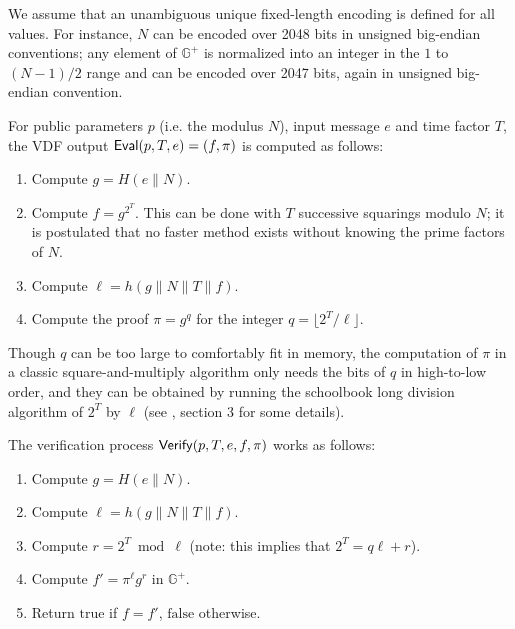 \documentclass{llncs}
\newcommand{\bG}{\mathbb{G}}
\newcommand{\Eval}{\text{\textsf{Eval}}}
\newcommand{\Verify}{\text{\textsf{Verify}}}
\begin{document}
We assume that an unambiguous unique fixed-length encoding is defined
for all values. For instance, $N$ can be encoded over 2048 bits in
unsigned big-endian conventions; any element of $\bG^+$ is normalized
into an integer in the $1$ to $(N-1)/2$ range and can be encoded over
2047 bits, again in unsigned big-endian convention.

For public parameters $p$ (i.e. the modulus $N$), input message $e$ and
time factor $T$, the VDF output $\Eval(p, T, e) = (f, \pi)$ is computed
as follows:
\begin{enumerate}

    \item Compute $g = H(e \parallel N)$.

    \item Compute $f = g^{2^T}$. This can be done with $T$ successive
    squarings modulo $N$; it is postulated that no faster method exists
    without knowing the prime factors of $N$.

    \item Compute $\ell = h(g \parallel N \parallel T \parallel f)$.

    \item Compute the proof $\pi = g^q$ for the integer
    $q = \lfloor 2^T/\ell\rfloor$.

\end{enumerate}

Though $q$ can be too large to comfortably fit in memory, the
computation of $\pi$ in a classic square-and-multiply algorithm only
needs the bits of $q$ in high-to-low order, and they can be obtained by
running the schoolbook long division algorithm of $2^T$ by $\ell$ (see
\cite{BonBunFis2018}, section 3 for some details).

The verification process $\Verify(p, T, e, f, \pi)$ works as follows:
\begin{enumerate}

    \item Compute $g = H(e \parallel N)$.

    \item Compute $\ell = h(g \parallel N \parallel T \parallel f)$.

    \item Compute $r = 2^T \bmod \ell$ (note: this implies that
    $2^T = q\ell + r$).

    \item Compute $f' = \pi^\ell g^r$ in $\bG^+$.

    \item Return $\text{true}$ if $f = f'$, $\text{false}$ otherwise.

\end{enumerate}
\end{document}
